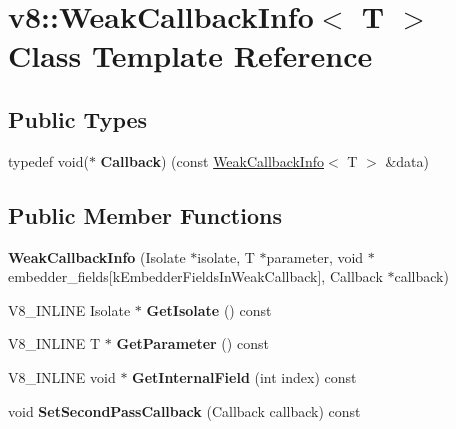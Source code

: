 \hypertarget{classv8_1_1WeakCallbackInfo}{}\section{v8\+:\+:Weak\+Callback\+Info$<$ T $>$ Class Template Reference}
\label{classv8_1_1WeakCallbackInfo}
\subsection*{Public Types}
\begin{DoxyCompactItemize}
\item 
\mbox{\label{classv8_1_1WeakCallbackInfo_a75f50fddcc9d5989e9cc04f8ab144d7d}} 
typedef void($\ast$ {\bfseries Callback}) (const \mbox{\hyperlink{classv8_1_1WeakCallbackInfo}{Weak\+Callback\+Info}}$<$ T $>$ \&data)
\end{DoxyCompactItemize}
\subsection*{Public Member Functions}
\begin{DoxyCompactItemize}
\item 
\mbox{\label{classv8_1_1WeakCallbackInfo_aabf19115b690b9baf1da8f440dfb3aa6}} 
{\bfseries Weak\+Callback\+Info} (Isolate $\ast$isolate, T $\ast$parameter, void $\ast$embedder\+\_\+fields\mbox{[}k\+Embedder\+Fields\+In\+Weak\+Callback\mbox{]}, Callback $\ast$callback)
\item 
\mbox{\label{classv8_1_1WeakCallbackInfo_a4cc354ee04d52d5ab880f1e9f85966c1}} 
V8\+\_\+\+I\+N\+L\+I\+NE Isolate $\ast$ {\bfseries Get\+Isolate} () const
\item 
\mbox{\label{classv8_1_1WeakCallbackInfo_a7fcf0d86f88eb066967de3c0e4a77ed4}} 
V8\+\_\+\+I\+N\+L\+I\+NE T $\ast$ {\bfseries Get\+Parameter} () const
\item 
\mbox{\label{classv8_1_1WeakCallbackInfo_a00732c95f8c130fba45ee6bbb3d3d819}} 
V8\+\_\+\+I\+N\+L\+I\+NE void $\ast$ {\bfseries Get\+Internal\+Field} (int index) const
\item 
\mbox{\label{classv8_1_1WeakCallbackInfo_af0f671ce037ff91319683e8f01645865}} 
void {\bfseries Set\+Second\+Pass\+Callback} (Callback callback) const
\end{DoxyCompactItemize}


